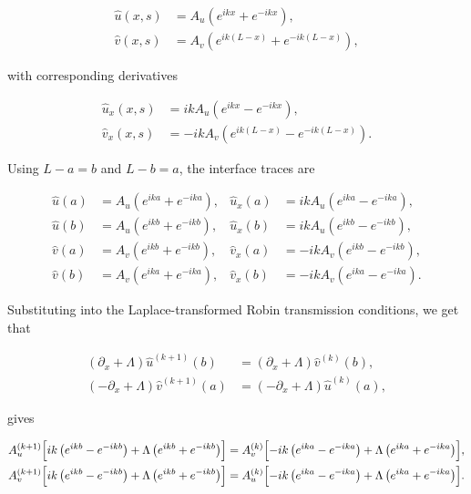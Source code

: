 \documentclass{Configuration_Files/PoliMi3i_thesis}
\begin{document}
\begin{align*}
\widehat{u}(x,s) &= A_u\left(e^{ikx}+e^{-ikx}\right), \\
\widehat{v}(x,s) &= A_v\left(e^{ik(L-x)}+e^{-ik(L-x)}\right),
\end{align*}

with corresponding derivatives

\begin{align*}
\widehat{u}_x(x,s) &= ikA_u\left(e^{ikx}-e^{-ikx}\right), \\
\widehat{v}_x(x,s) &= -ikA_v\left(e^{ik(L-x)}-e^{-ik(L-x)}\right).
\end{align*}

Using $L-a=b$ and $L-b=a$, the interface traces are

\begin{align*}
\widehat{u}(a) &= A_u\left(e^{ika}+e^{-ika}\right),
&
\widehat{u}_x(a) &= ikA_u\left(e^{ika}-e^{-ika}\right),
\\
\widehat{u}(b) &= A_u\left(e^{ikb}+e^{-ikb}\right),
&
\widehat{u}_x(b) &= ikA_u\left(e^{ikb}-e^{-ikb}\right),
\\
\widehat{v}(a) &= A_v\left(e^{ikb}+e^{-ikb}\right),
&
\widehat{v}_x(a) &= -ikA_v\left(e^{ikb}-e^{-ikb}\right),
\\
\widehat{v}(b) &= A_v\left(e^{ika}+e^{-ika}\right),
&
\widehat{v}_x(b) &= -ikA_v\left(e^{ika}-e^{-ika}\right).
\end{align*}

Substituting into the Laplace-transformed Robin transmission conditions, we get that

\begin{align*}
(\partial_x+\Lambda)\widehat{u}^{(k+1)}(b)
&=
(\partial_x+\Lambda)\widehat{v}^{(k)}(b),
\\
(-\partial_x+\Lambda)\widehat{v}^{(k+1)}(a)
&=
(-\partial_x+\Lambda)\widehat{u}^{(k)}(a),
\end{align*}

gives

\begin{align*}
A_u^{(k+1)}
\Bigl[
ik\left(e^{ikb}-e^{-ikb}\right)
+\Lambda\left(e^{ikb}+e^{-ikb}\right)
\Bigr]
&=
A_v^{(k)}
\Bigl[
-ik\left(e^{ika}-e^{-ika}\right)
+\Lambda\left(e^{ika}+e^{-ika}\right)
\Bigr],
\\
A_v^{(k+1)}
\Bigl[
ik\left(e^{ikb}-e^{-ikb}\right)
+\Lambda\left(e^{ikb}+e^{-ikb}\right)
\Bigr]
&=
A_u^{(k)}
\Bigl[
-ik\left(e^{ika}-e^{-ika}\right)
+\Lambda\left(e^{ika}+e^{-ika}\right)
\Bigr].
\end{align*}
\end{document}
